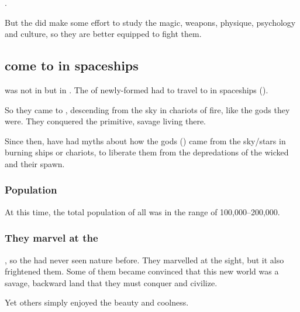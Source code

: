 . 

But the \resphain did make some effort to study the \psp{\dragons}{} magic, weapons, physique, psychology and culture, so they are better equipped to fight them. 










\subsection{\Resphain{} come to \Tembrae{} in spaceships}
\Merkyrah{} was not in \Tembrae{} but in \Nyx. 
The \resphain{} of newly-formed \CiriathSepher{} had to travel to \Tembrae{} in spaceships (). 

So they came to \Tembrae{}, descending from the sky in chariots of fire, like the gods they were. 
They conquered the primitive, savage \humans{} living there. 

Since then, \humans{} have had myths about how the gods (\resphain) came from the sky/stars in burning ships or chariots, to liberate them from the depredations of the wicked \dragons{} and their spawn.





\subsubsection{Population}
At this time, the total population of all \resphain{} was in the range of 100,000--200,000. 





\subsubsection{They marvel at the \Wylde}
, so the \resphain{} had never seen \Wylde{} nature before. 
They marvelled at the sight, but it also frightened them. 
Some of them became convinced that this new world was a savage, backward land that they must conquer and civilize. 

Yet others simply enjoyed the beauty and coolness. 

